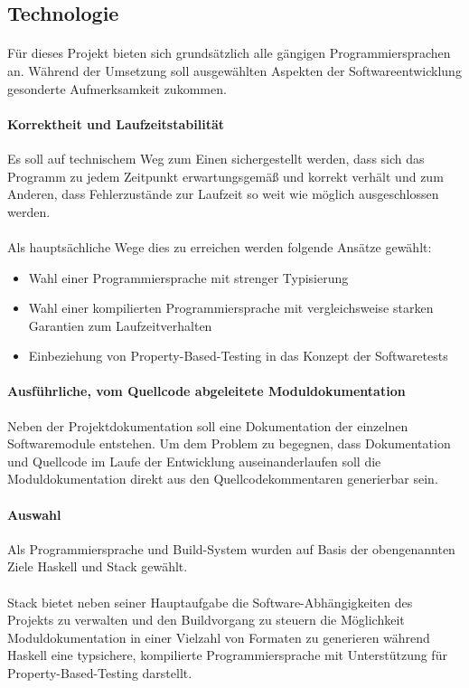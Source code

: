 \subsection{Technologie}
\paragraph{}
Für dieses Projekt bieten sich grundsätzlich alle gängigen Programmiersprachen
an. Während der Umsetzung soll ausgewählten Aspekten der Softwareentwicklung
gesonderte Aufmerksamkeit zukommen.

\paragraph{Korrektheit und Laufzeitstabilität} Es soll auf technischem Weg zum
Einen sichergestellt werden, dass sich das Programm zu jedem Zeitpunkt erwartungsgemäß
und korrekt verhält und zum Anderen, dass Fehlerzustände zur Laufzeit so weit
wie möglich ausgeschlossen werden.

\paragraph{}
Als hauptsächliche Wege dies zu erreichen werden folgende Ansätze gewählt:

\begin{itemize}
    \item Wahl einer Programmiersprache mit strenger Typisierung
    \item Wahl einer kompilierten Programmiersprache mit vergleichsweise starken
          Garantien zum Laufzeitverhalten
    \item Einbeziehung von \gls{Property-Based-Testing} \cite{property-based-testing} in das Konzept der Softwaretests
\end{itemize}

\paragraph{Ausführliche, vom Quellcode abgeleitete Moduldokumentation}
Neben der Projektdokumentation soll eine Dokumentation der einzelnen
Softwaremodule entstehen. Um dem Problem zu begegnen, dass Dokumentation und
Quellcode im Laufe der Entwicklung auseinanderlaufen soll die Moduldokumentation
direkt aus den Quellcodekommentaren generierbar sein.

\paragraph{Auswahl}
Als Programmiersprache und Build-System wurden auf Basis der obengenannten Ziele
Haskell \cite{haskell} und Stack \cite{stack} gewählt.

\paragraph{}
Stack bietet neben seiner Hauptaufgabe die Software-Abhängigkeiten des Projekts
zu verwalten und den Buildvorgang zu steuern die Möglichkeit Moduldokumentation
in einer Vielzahl von Formaten zu generieren während Haskell eine typsichere,
kompilierte Programmiersprache mit Unterstützung für \gls{Property-Based-Testing}
darstellt.